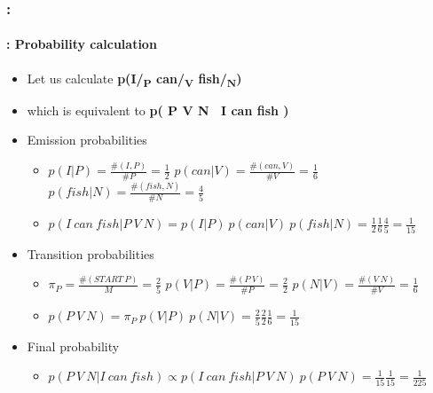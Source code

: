 \documentclass[xcolor=table]{beamer}
\begin{document}
\begin{frame}
	\frametitle{\insertshortsubtitle: \insertsection}
	\framesubtitle{\insertsubsection: Probability calculation}
	
	\begin{itemize}
		\item Let us calculate \textbf{p(I/\textsubscript{P} can/\textsubscript{V} fish/\textsubscript{N})}
		\item which is equivalent to \textbf{p( P V N \textbar\ I can fish )}
		\item Emission probabilities
		\begin{itemize}
			\item $ p(I|P) = \frac{\#(I,P)}{\#P} = \frac{1}{2} $ \hspace{6pt} 
			$ p(can|V) = \frac{\#(can,V)}{\#V} = \frac{1}{6} $ \hspace{6pt}
			$ p(fish|N) = \frac{\#(fish,N)}{\#N} = \frac{4}{5} $
			\item $ p(I\ can\ fish | P\ V\ N) = p(I|P)\ p(can|V)\ p(fish|N) = \frac{1}{2} \frac{1}{6} \frac{4}{5} = \frac{1}{15}$
		\end{itemize}
		\item Transition probabilities
		\begin{itemize}
			\item $ \pi_P = \frac{\#(START\ P)}{M} = \frac{2}{5} $ \hspace{6pt} 
			$ p(V|P) = \frac{\#(P\ V)}{\#P} = \frac{2}{2} $ \hspace{6pt} 
			$ p(N|V) = \frac{\#(V\ N)}{\#V} = \frac{1}{6} $
			\item $ p(P\ V\ N) = \pi_P\ p(V|P)\ p(N|V) = \frac{2}{5} \frac{2}{2} \frac{1}{6} = \frac{1}{15}$
		\end{itemize}
		\item Final probability
		\begin{itemize}
			\item $ p(P\ V\ N | I\ can\ fish) \propto p(I\ can\ fish | P\ V\ N)\ p(P\ V\ N) = \frac{1}{15} \frac{1}{15} = \frac{1}{225}$
		\end{itemize}
	\end{itemize}

%	
%	
%	
%	
%	
	
	
\end{frame}
\end{document}
